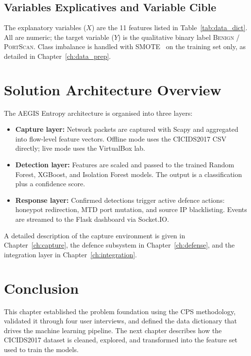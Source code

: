 \documentclass[12pt,a4paper]{report}
\begin{document}
\subsection{Variables Explicatives and Variable Cible}

The explanatory variables ($X$) are the 11 features listed in Table~\ref{tab:data_dict}. All are numeric; the target variable ($Y$) is the qualitative binary label \textsc{Benign} / \textsc{PortScan}. Class imbalance is handled with SMOTE~\cite{chawla2002} on the training set only, as detailed in Chapter~\ref{ch:data_prep}.

\section{Solution Architecture Overview}

The AEGIS Entropy architecture is organised into three layers:

\begin{itemize}
    \item \textbf{Capture layer:} Network packets are captured with Scapy and aggregated into flow-level feature vectors. Offline mode uses the CICIDS2017 CSV directly; live mode uses the VirtualBox lab.
    \item \textbf{Detection layer:} Features are scaled and passed to the trained Random Forest, XGBoost, and Isolation Forest models. The output is a classification plus a confidence score.
    \item \textbf{Response layer:} Confirmed detections trigger active defence actions: honeypot redirection, MTD port mutation, and source IP blacklisting. Events are streamed to the Flask dashboard via Socket.IO.
\end{itemize}

A detailed description of the capture environment is given in Chapter~\ref{ch:capture}, the defence subsystem in Chapter~\ref{ch:defense}, and the integration layer in Chapter~\ref{ch:integration}.

\section{Conclusion}

This chapter established the problem foundation using the CPS methodology, validated it through four user interviews, and defined the data dictionary that drives the machine learning pipeline. The next chapter describes how the CICIDS2017 dataset is cleaned, explored, and transformed into the feature set used to train the models.
\end{document}
